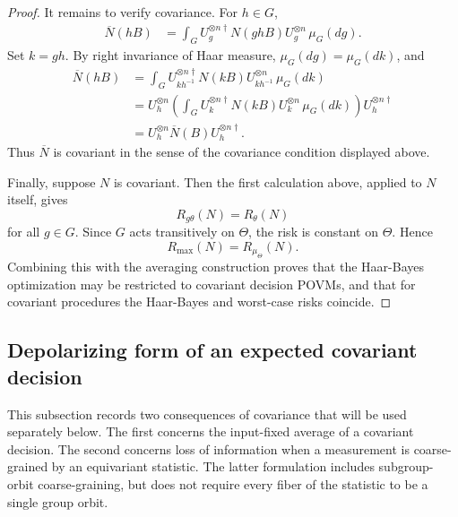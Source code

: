 \documentclass[journal]{IEEEtran}
\begin{document}
\begin{proof}
It remains to verify covariance.  For \(h\in G\),
\[
\begin{aligned}
    \overline N(hB)
    &=
    \int_G
    U_g^{\otimes n\dagger}N(ghB)U_g^{\otimes n}
    \,\mu_G(dg).
\end{aligned}
\]
Set \(k=gh\).  By right invariance of Haar measure, \(\mu_G(dg)=\mu_G(dk)\), and
\[
\begin{aligned}
    \overline N(hB)
    &=
    \int_G
    U_{kh^{-1}}^{\otimes n\dagger}N(kB)U_{kh^{-1}}^{\otimes n}
    \,\mu_G(dk)                                                \\
    &=
    U_h^{\otimes n}
    \left(
        \int_G U_k^{\otimes n\dagger}N(kB)U_k^{\otimes n}
        \,\mu_G(dk)
    \right)
    U_h^{\otimes n\dagger}                                      \\
    &=
    U_h^{\otimes n}\overline N(B)U_h^{\otimes n\dagger}.
\end{aligned}
\]
Thus \(\overline N\) is covariant in the sense of
the covariance condition displayed above.

Finally, suppose \(N\) is covariant.  Then the first calculation above, applied
to \(N\) itself, gives
\[
    R_{g\theta}(N)=R_\theta(N)
\]
for all \(g\in G\).  Since \(G\) acts transitively on \(\Theta\), the risk is
constant on \(\Theta\).  Hence
\[
    R_{\max}(N)=R_{\mu_\Theta}(N).
\]
Combining this with the averaging construction proves that the Haar-Bayes
optimization may be restricted to covariant decision POVMs, and that for
covariant procedures the Haar-Bayes and worst-case risks coincide.

\end{proof}



\subsection{Depolarizing form of an expected covariant decision}
\label{subsec:covariant_expected_decision}

This subsection records two consequences of covariance that will be used
separately below.  The first concerns the input-fixed average of a covariant
decision.  The second concerns loss of information when a measurement is
coarse-grained by an equivariant statistic.  The latter formulation includes
subgroup-orbit coarse-graining, but does not require every fiber of the
statistic to be a single group orbit.
\end{document}
